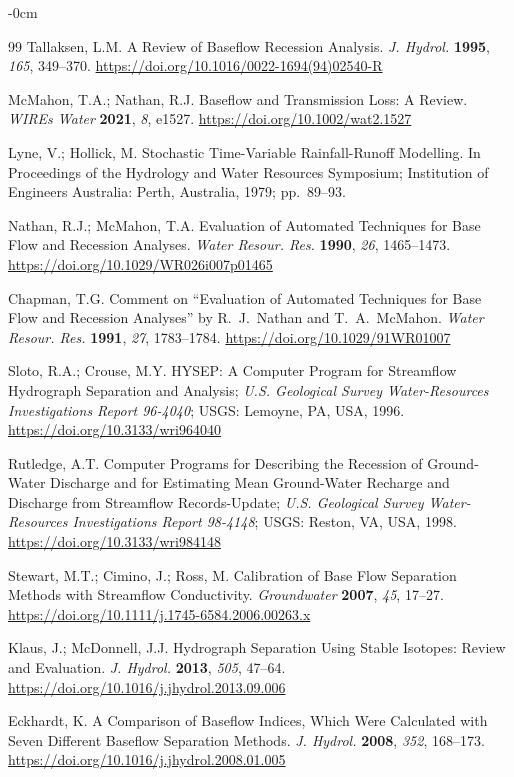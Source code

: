 \documentclass[hydrology,article,submit,pdftex,moreauthors]{Definitions/mdpi}
\begin{document}
\begin{adjustwidth}{-\extralength}{0cm}
\begin{thebibliography}{99}
Tallaksen, L.M. A Review of Baseflow Recession Analysis. \textit{J. Hydrol.} \textbf{1995}, \textit{165}, 349--370. \url{https://doi.org/10.1016/0022-1694(94)02540-R}

McMahon, T.A.; Nathan, R.J. Baseflow and Transmission Loss: A Review. \textit{WIREs Water} \textbf{2021}, \textit{8}, e1527. \url{https://doi.org/10.1002/wat2.1527}

Lyne, V.; Hollick, M. Stochastic Time-Variable Rainfall-Runoff Modelling. In Proceedings of the Hydrology and Water Resources Symposium; Institution of Engineers Australia: Perth, Australia, 1979; pp.~89--93.

Nathan, R.J.; McMahon, T.A. Evaluation of Automated Techniques for Base Flow and Recession Analyses. \textit{Water Resour. Res.} \textbf{1990}, \textit{26}, 1465--1473. \url{https://doi.org/10.1029/WR026i007p01465}

Chapman, T.G. Comment on ``Evaluation of Automated Techniques for Base Flow and Recession Analyses'' by R.~J.~Nathan and T.~A.~McMahon. \textit{Water Resour. Res.} \textbf{1991}, \textit{27}, 1783--1784. \url{https://doi.org/10.1029/91WR01007}

Sloto, R.A.; Crouse, M.Y. HYSEP: A Computer Program for Streamflow Hydrograph Separation and Analysis; \textit{U.S. Geological Survey Water-Resources Investigations Report 96-4040}; USGS: Lemoyne, PA, USA, 1996. \url{https://doi.org/10.3133/wri964040}

Rutledge, A.T. Computer Programs for Describing the Recession of Ground-Water Discharge and for Estimating Mean Ground-Water Recharge and Discharge from Streamflow Records-Update; \textit{U.S. Geological Survey Water-Resources Investigations Report 98-4148}; USGS: Reston, VA, USA, 1998. \url{https://doi.org/10.3133/wri984148}

Stewart, M.T.; Cimino, J.; Ross, M. Calibration of Base Flow Separation Methods with Streamflow Conductivity. \textit{Groundwater} \textbf{2007}, \textit{45}, 17--27. \url{https://doi.org/10.1111/j.1745-6584.2006.00263.x}

Klaus, J.; McDonnell, J.J. Hydrograph Separation Using Stable Isotopes: Review and Evaluation. \textit{J. Hydrol.} \textbf{2013}, \textit{505}, 47--64. \url{https://doi.org/10.1016/j.jhydrol.2013.09.006}

Eckhardt, K. A Comparison of Baseflow Indices, Which Were Calculated with Seven Different Baseflow Separation Methods. \textit{J. Hydrol.} \textbf{2008}, \textit{352}, 168--173. \url{https://doi.org/10.1016/j.jhydrol.2008.01.005}


\end{thebibliography}
\end{adjustwidth}
\end{document}
